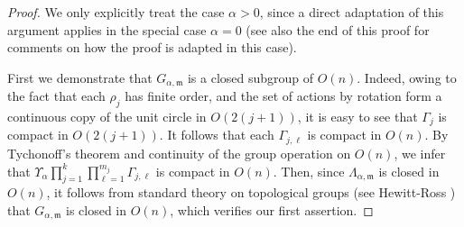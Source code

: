 \documentclass[10pt, reqno]{amsart}
\newcommand{\m}{\mathfrak{m}}
\numberwithin{equation}{section}
\theoremstyle{definition}
\theoremstyle{remark}
\theoremstyle{plain}
\begin{document}
		\begin{proof}
		We only explicitly treat the case $\alpha > 0$, since a direct adaptation of this argument applies in the special case $\alpha = 0$ (see also the end of this proof for comments on how the proof is adapted in this case).
		
		First we demonstrate that $G_{\alpha,\m}$ is a closed subgroup of $O(n)$. Indeed, owing to the fact that each $\rho_j$ has finite order, and the set of actions by rotation form a continuous copy of the unit circle in $O(2(j+1))$, it is easy to see that $\Gamma_j$ is compact in $O(2(j+1))$. It follows that each $\Gamma_{j,\ell}$ is compact in $O(n)$. By Tychonoff's theorem and continuity of the group operation on $O(n)$, we infer that $\Upsilon_\alpha\prod_{j=1}^k \prod_{\ell=1}^{m_j} \Gamma_{j,\ell}$ is compact in $O(n)$. Then, since $\Lambda_{\alpha,\m}$ is closed in $O(n)$, it follows from standard theory on topological groups (see Hewitt-Ross \cite{hewittRoss}) that $G_{\alpha,\m}$ is closed in $O(n)$, which verifies our first assertion.
		

\end{proof}
\end{document}
